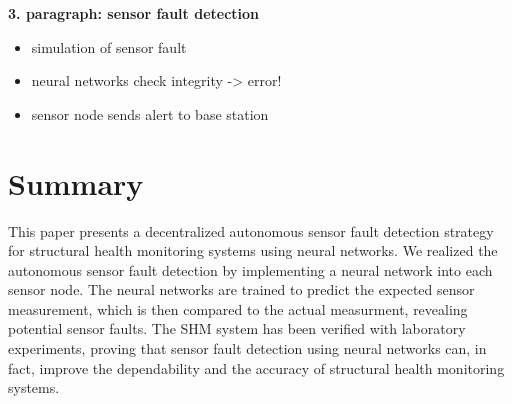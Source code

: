 \documentclass[12pt,a4paper]{scrartcl}
\begin{document}
\textbf{3. paragraph: sensor fault detection}

\begin{itemize}
\item simulation of sensor fault
\item neural networks check integrity -> error!
\item sensor node sends alert to base station
\end{itemize}




\section*{Summary}

This paper presents a decentralized autonomous sensor fault detection strategy for structural health monitoring systems using neural networks. 
We realized the autonomous sensor fault detection by implementing a neural network into each sensor node.
The neural networks are trained to predict the expected sensor measurement, which is then compared to the actual measurment, revealing potential sensor faults.
The SHM system has been verified with laboratory experiments, proving that sensor fault detection using neural networks can, in fact, improve the dependability and the accuracy of structural health monitoring systems.




\end{document}
